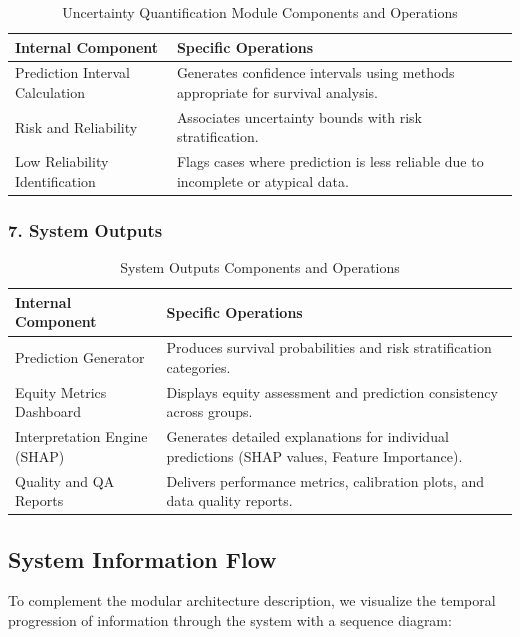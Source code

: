 \begin{table}[H]
\centering
\begin{tabular}{|p{5cm}|p{9cm}|}
\hline
\textbf{Internal Component} & \textbf{Specific Operations} \\
\hline
Prediction Interval Calculation & Generates confidence intervals using methods appropriate for survival analysis. \\
\hline
Risk and Reliability & Associates uncertainty bounds with risk stratification. \\
\hline
Low Reliability Identification & Flags cases where prediction is less reliable due to incomplete or atypical data. \\
\hline
\end{tabular}
\caption{Uncertainty Quantification Module Components and Operations}
\label{tab:uncertainty_module}
\end{table}

\subsubsection{7. System Outputs}

\begin{table}[H]
\centering
\begin{tabular}{|p{5cm}|p{9cm}|}
\hline
\textbf{Internal Component} & \textbf{Specific Operations} \\
\hline
Prediction Generator & Produces survival probabilities and risk stratification categories. \\
\hline
Equity Metrics Dashboard & Displays equity assessment and prediction consistency across groups. \\
\hline
Interpretation Engine (SHAP) & Generates detailed explanations for individual predictions (SHAP values, Feature Importance). \\
\hline
Quality and QA Reports & Delivers performance metrics, calibration plots, and data quality reports. \\
\hline
\end{tabular}
\caption{System Outputs Components and Operations}
\label{tab:outputs_module}
\end{table}

\subsection{System Information Flow}

To complement the modular architecture description, we visualize the temporal progression of information through the system with a sequence diagram:

